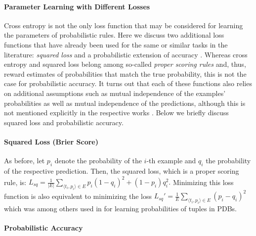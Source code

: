 \documentclass[akbc,twoside,11pt]{article}
\newcounter{example}
\begin{document}
\paragraph{Parameter Learning with Different Losses}

Cross entropy is not the only loss function that may be considered for learning the parameters of probabilistic rules. Here we discuss two additional loss functions that have already been used for the same or similar tasks in the literature: {\em squared loss} \cite{theobald_learning} and a probabilistic extension of accuracy \cite{DBLP:conf/ijcai/RaedtDTBV15}. Whereas cross entropy and squared loss belong among so-called {\em proper scoring rules} \cite{gneiting2007strictly} and, thus, reward estimates of probabilities that match the true probability, this is not the case for probabilistic accuracy. It turns out that each of these functions also relies on additional assumptions such as mutual independence of the examples' probabilities as well as mutual independence of the predictions, although this is not mentioned explicitly in the respective works \cite{theobald_learning,DBLP:conf/ijcai/RaedtDTBV15}. Below we briefly discuss squared loss and probabilistic accuracy.

\paragraph{Squared Loss (Brier Score)}

As before, let $p_i$ denote the probability of the $i$-th example and $q_i$ the probability of the respective prediction. Then, the squared loss, which is a proper scoring rule, is:
$L_{sq} = \frac{1}{|E|}\sum_{\langle t_i, p_i \rangle \in E} p_i (1-q_i)^2 + (1-p_i) q_i^2.$
Minimizing this loss function is also equivalent to minimizing the loss $L_{sq}' = \frac{1}{E} \sum_{\langle t_i, p_i \rangle \in E} \left(p_i - q_i \right)^2$
which was among others used in \cite{theobald_learning} for learning probabilities of tuples in PDBs.

\paragraph{Probabilistic Accuracy}
\end{document}
